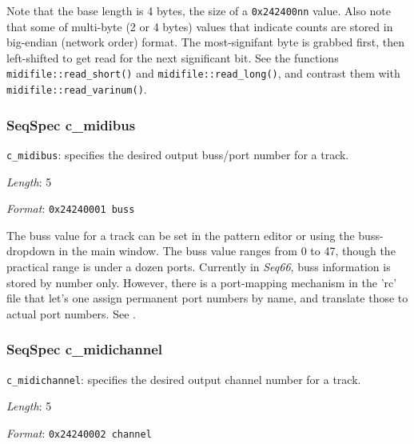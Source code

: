    Note that the base length is 4 bytes, the size of a \texttt{0x242400nn}
   value.  Also note that some of multi-byte (2 or 4 bytes) values that
   indicate counts are stored in big-endian (network order) format.  The
   most-signifant byte is grabbed first, then
   left-shifted to get read for the next significant bit.
   See the functions
   \texttt{midifile::read\_short()} and
   \texttt{midifile::read\_long()}, and contrast them with
   \texttt{midifile::read\_varinum()}.

\subsubsection{SeqSpec c\_midibus}
\label{subsubsec:midi_format_track_seqspec_midibus}


   \begin{description}
      \item \texttt{c\_midibus}:
         specifies the desired output buss/port number for a track.
      \item \textsl{Length}: 5
      \item \textsl{Format}: \texttt{0x24240001 buss}
   \end{description}

   The buss value for a track can be set in the pattern editor or using the
   buss-dropdown in the main window.
   The buss value ranges from 0 to 47, though the practical range is under a
   dozen ports.  Currently in \textsl{Seq66}, buss information is stored by
   number only.  However, there is a port-mapping mechanism in the 'rc' file
   that let's one assign permanent port numbers by name, and translate those to
   actual port numbers.
   See .

\subsubsection{SeqSpec c\_midichannel}
\label{subsubsec:midi_format_track_seqspec_midichannel}


   \begin{description}
      \item \texttt{c\_midichannel}:
         specifies the desired output channel number for a track.
      \item \textsl{Length}: 5
      \item \textsl{Format}: \texttt{0x24240002 channel}
   \end{description}

